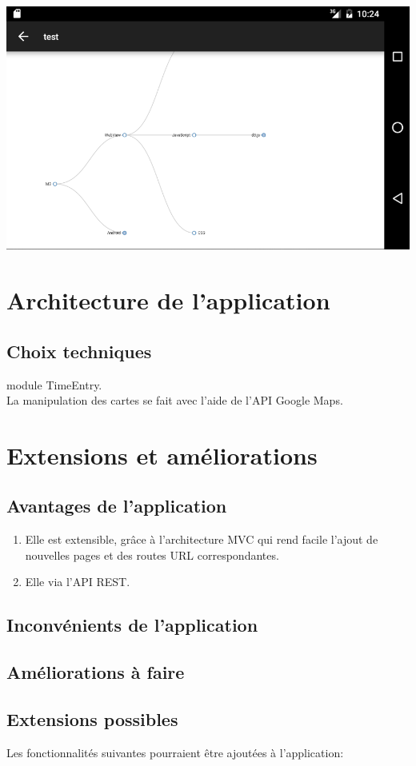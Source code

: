 \documentclass[11pt,a4paper,margin=0.5in]{report}
\begin{document}
\begin{center}
\includegraphics[scale=0.33]{coll.png} \\[0.25in]
\end{center}

\clearpage

\chapter{Architecture de l'application}

\section{Choix techniques}

\vspace{0.5cm}

module TimeEntry.\\[0.1in]
La manipulation des cartes se fait avec l'aide de l'API Google Maps.

\chapter{Extensions et améliorations}

\section{Avantages de l'application}
\begin{enumerate}
    \item Elle est extensible, grâce à l'architecture MVC qui rend facile l'ajout de nouvelles pages et des routes URL correspondantes.
    \item Elle via l'API REST.
\end{enumerate}

\section{Inconvénients de l'application}

\section{Améliorations à faire}

\section{Extensions possibles}
Les fonctionnalités suivantes pourraient être ajoutées à l'application:
\end{document}

